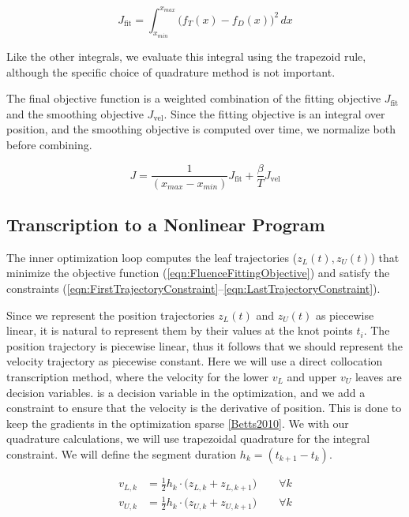 \begin{equation}
  J_\text{fit} = \int_{x_{min}}^{x_{max}} \! \big( f_T(x) - f_D(x) \big)^2 \,dx
\end{equation}

Like the other integrals, we evaluate this integral using the trapezoid rule,
although the specific choice of quadrature method is not important.

The final objective function is a weighted combination of the
fitting objective $J_\text{fit}$ and the smoothing objective $J_\text{vel}$.
Since the fitting objective is an integral over position, and the smoothing objective
is computed over time, we normalize both before combining.

\begin{equation}
  J = \frac{1}{(x_{max} - x_{min})} J_\text{fit}
    + \frac{\beta}{T} J_\text{vel}
\label{eqn:FluenceFittingObjective}
\end{equation}

\subsection{Transcription to a Nonlinear Program}

The inner optimization loop computes the leaf trajectories ($z_L(t), z_U(t)$)
that minimize the objective function (\ref{eqn:FluenceFittingObjective})
and satisfy the constraints (\ref{eqn:FirstTrajectoryConstraint}--\ref{eqn:LastTrajectoryConstraint}).

Since we represent the position trajectories $z_L(t)$ and $z_U(t)$ as piecewise linear,
it is natural to represent them by their values at the knot points $t_i$.
The position trajectory is piecewise linear, thus it follows that we should represent the
velocity trajectory as piecewise constant.
Here we will use a direct collocation transcription method, where the velocity for the
lower $v_L$ and upper $v_U$ leaves are decision variables.
is a decision variable in the optimization,
and we add a constraint to ensure that the velocity is the derivative of position.
This is done to keep the gradients in the optimization sparse \ref{Betts2010}.
We with our quadrature calculations, we will use trapezoidal quadrature for the integral constraint.
We will define the segment duration $h_k = (t_{k+1} - t_k)$.

\begin{align}
  v_{L,k} & = \tfrac{1}{2} h_k \cdot  \big( z_{L, k} + z_{L, k+1} \big)
  \quad \quad \forall k\\
  v_{U,k} & = \tfrac{1}{2} h_k \cdot  \big( z_{U, k} + z_{U, k+1} \big)
  \quad \quad \forall k\\
\end{align}

